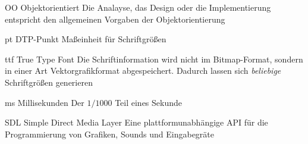   {OO}            %
  {Objektorientiert}  %
  {Die Analayse, das Design oder die Implementierung entspricht den allgemeinen Vorgaben der Objektorientierung} %

  {pt}            %
  {DTP-Punkt}  %
  {Maßeinheit für Schriftgrößen} %

  {ttf}            %
  {True Type Font}  %
  {Die Schriftinformation wird nicht im Bitmap-Format, sondern in einer Art Vektorgrafikformat abgespeichert. Dadurch lassen sich \emph{beliebige} Schriftgrößen generieren} %

  {ms}            %
  {Millisekunden}  %
  {Der $1/1000$ Teil eines Sekunde} %

{SDL}            %
{Simple Direct Media Layer}  %
{Eine plattformunabhängige API für die Programmierung von Grafiken, Sounds und Eingabegräte} %

